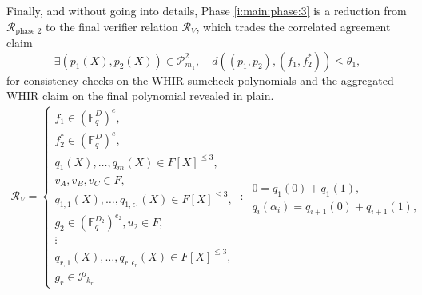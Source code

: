 Finally, and without going into details, Phase \ref{i:main:phase:3} is a reduction from $\mathcal R_\text{phase 2}$ to the final verifier relation $\mathcal R_{V}$, which trades the correlated agreement claim
\[
\exists (p_1(X),p_2(X)) \in \mathscr P_{m_1}^2, \quad
        d((p_1,p_2), (f_1,f_2^*)) \leq \theta_1,
\]
for consistency checks on the WHIR sumcheck polynomials and the aggregated WHIR claim on the final polynomial revealed in plain. 
\begin{align}
\mathcal R_{V} =
\left\{
    \begin{matrix}
        f_1 \in \left(\mathbb F_q^{D}\right)^{e}, %
        \\
        f_2^* \in \left(\mathbb F_q^{D}\right)^{e}, %
        \\
        q_1(X), \ldots, q_m(X) \in F[X]^{\leq 3},
        \\
        v_A, v_B, v_C \in F,
        \\
        q_{1,1}(X),\ldots, q_{1,\epsilon_1}(X) \in F[X]^{\leq 3},
        \\
        g_2 \in \left(\mathbb F_q^{D_{2}}\right)^{e_{2}},  u_2\in F, 
        \\
        \vdots
        \\
        q_{r,1}(X),\ldots, q_{r,\epsilon_r}(X) \in F[X]^{\leq 3},
        \\
        g_r \in \mathscr P_{k_r} 
    \end{matrix}
    \::\:
    \begin{matrix}
        \\
        0 = q_1(0) + q_1(1),
        \\
        q_i(\alpha_i) = q_{i+1}(0) + q_{i+1}(1),

\end{matrix}
\end{align}
